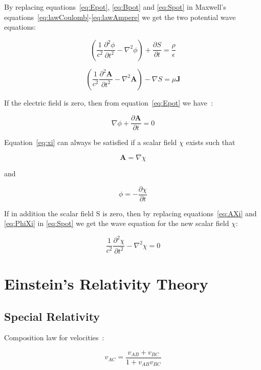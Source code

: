 \documentclass[english]{book}
\begin{document}
By replacing equations~\ref{eq:Epot}, \ref{eq:Bpot} and \ref{eq:Spot} in Maxwell's equations~\ref{eq:lawCoulomb}-\ref{eq:lawAmpere} we get the two potential wave equations:

\[
\left( \frac{1}{c^{2}}\frac{\partial^{2}\phi}{\partial t^{2}} - \nabla^{2}\phi \right) + \frac{\partial S}{\partial t} = \frac{\rho}{\epsilon}
\]

\[
\left( \frac{1}{c^{2}}\frac{\partial^{2}\mathbf{A}}{\partial t^{2}} - \nabla^{2}\mathbf{A} \right) - \nabla S = \mu \mathbf{J}
\]

If the electric field is zero, then from equation~\ref{eq:Epot} we have~\cite{Dea}:

\begin{equation}
\nabla\phi + \frac{\partial\mathbf{A}}{\partial t} = 0      \label{eq:xi}
\end{equation}

Equation~\ref{eq:xi} can always be satisfied if a scalar field $\chi$ exists such that

\begin{equation}
\mathbf{A} = \nabla \chi      \label{eq:AXi}
\end{equation}

and

\begin{equation}
\phi = - \frac{\partial \chi}{\partial t}        \label{eq:PhiXi}
\end{equation}

If in addition the scalar field S is zero, then by replacing equations~\ref{eq:AXi} and \ref{eq:PhiXi} in \ref{eq:Spot} we get the wave equation for the new scalar field $\chi$:

\begin{equation}
\frac{1}{c^{2}}\frac{\partial^{2}\chi}{\partial t^{2}} - \nabla^{2}\chi = 0
\end{equation}


\chapter{Einstein's Relativity Theory}

\section{Special Relativity}

Composition law for velocities~\cite{dInverno}:

\[
v_{AC} = \frac{v_{AB} + v_{BC}}{1+v_{AB}v_{BC}}
\]
\end{document}
